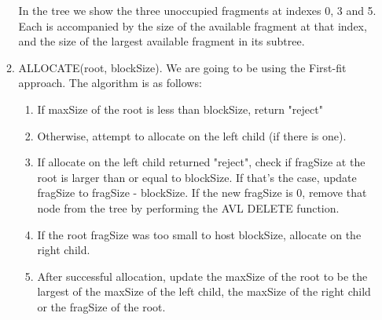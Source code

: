 \documentclass[11pt]{article}
\begin{document}
\begin{enumerate}
\begin{enumerate}
				In the tree we show the three unoccupied fragments at indexes 0, 3 and 5. Each is accompanied by the size of the available fragment at that index, and the size of the largest available fragment in its subtree.
				\item ALLOCATE(root, blockSize). We are going to be using the First-fit approach. The algorithm is as follows: 
				\begin{enumerate}
					\item If maxSize of the root is less than blockSize, return "reject" 
					\item Otherwise, attempt to allocate on the left child (if there is one). 
					\item If allocate on the left child returned "reject", check if fragSize at the root is larger than or equal to blockSize. If that's the case, update fragSize to fragSize - blockSize. If the new fragSize is 0, remove that node from the tree by performing the AVL DELETE function.
					\item If the root fragSize was too small to host blockSize, allocate on the right child.
					\item After successful allocation, update the maxSize of the root to be the largest of the maxSize of the left child, the maxSize of the right child or the fragSize of the root.
				

\end{enumerate}
\end{enumerate}
\end{enumerate}
\end{document}
